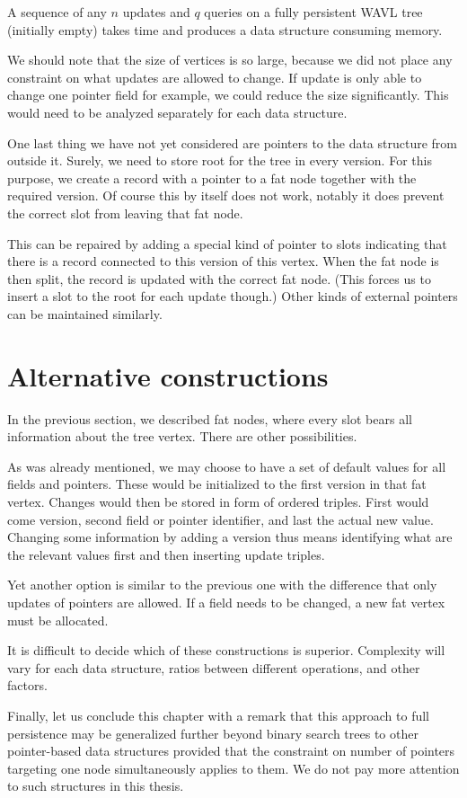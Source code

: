 \begin{cor}
A sequence of any $n$ updates and $q$ queries on a fully persistent WAVL tree (initially empty) takes  time and produces a data structure consuming  memory.
\end{cor}

We should note that the size of vertices is so large, because we did not place any constraint on what updates are allowed to change. If update is only able to change one pointer field for example, we could reduce the size significantly. This would need to be analyzed separately for each data structure.

One last thing we have not yet considered are pointers to the data structure from outside it. Surely, we need to store root for the tree in every version. For this purpose, we create a record with a pointer to a fat node together with the required version. Of course this by itself does not work, notably it does prevent the correct slot from leaving that fat node. 

This can be repaired by adding a special kind of pointer to slots indicating that there is a record connected to this version of this vertex. When the fat node is then split, the record is updated with the correct fat node. (This forces us to insert a slot to the root for each update though.) Other kinds of external pointers can be maintained similarly.

\section{Alternative constructions}

In the previous section, we described fat nodes, where every slot bears all information about the tree vertex. There are other possibilities.

As was already mentioned, we may choose to have a set of default values for all fields and pointers.
These would be initialized to the first version in that fat vertex. Changes would then be stored in form of ordered triples. First would come version, second field or pointer identifier, and last the actual new value. Changing some information by adding a version thus means identifying what are the relevant values first and then inserting update triples.

Yet another option is similar to the previous one with the difference that only updates of pointers are allowed. If a field needs to be changed, a new fat vertex must be allocated.

It is difficult to decide which of these constructions is superior. Complexity will vary for each data structure, ratios between different operations, and other factors.

Finally, let us conclude this chapter with a remark that this approach to full persistence may be generalized further beyond binary search trees to other pointer-based data structures provided that the constraint on number of pointers targeting one node simultaneously applies to them.
We do not pay more attention to such structures in this thesis.
